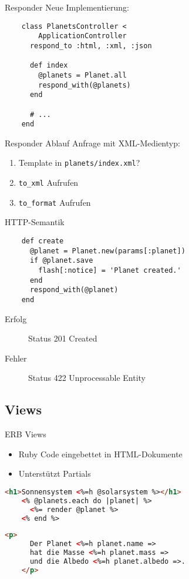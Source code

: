 \begin{frame}[fragile]{Responder}
  Neue Implementierung:
  \begin{lstlisting}
    class PlanetsController <
        ApplicationController
      respond_to :html, :xml, :json

      def index
        @planets = Planet.all
        respond_with(@planets)
      end

      # ...
    end
  \end{lstlisting}
\end{frame}

\begin{frame}{Responder Ablauf}
  Anfrage mit XML-Medientyp:
  \begin{enumerate}
    \item Template in \lstinline|planets/index.xml|?
    \item \lstinline|to_xml| Aufrufen
    \item \lstinline|to_format| Aufrufen
  \end{enumerate}
\end{frame}

\begin{frame}[fragile]{HTTP-Semantik}
  \begin{lstlisting}
    def create
      @planet = Planet.new(params[:planet])
      if @planet.save
        flash[:notice] = 'Planet created.'
      end
      respond_with(@planet)
    end
  \end{lstlisting}

  \begin{description}
    \item[Erfolg] Status 201 Created
    \item[Fehler] Status 422 Unprocessable Entity
  \end{description}
\end{frame}

\subsection{Views}

\begin{frame}[fragile]{ERB Views}
  \begin{itemize}
    \item Ruby Code eingebettet in HTML-Dokumente
    \item Unterstützt Partials
  \end{itemize}

  \begin{lstlisting}[language=HTML]
    <h1>Sonnensystem <%=h @solarsystem %></h1>
    <% @planets.each do |planet| %>
      <%= render @planet %>
    <% end %>
  \end{lstlisting}

  \begin{lstlisting}[language=HTML]
    <p>
      Der Planet <%=h planet.name =>
      hat die Masse <%=h planet.mass =>
      und die Albedo <%=h planet.albedo =>.
    </p>
  \end{lstlisting}
\end{frame}

